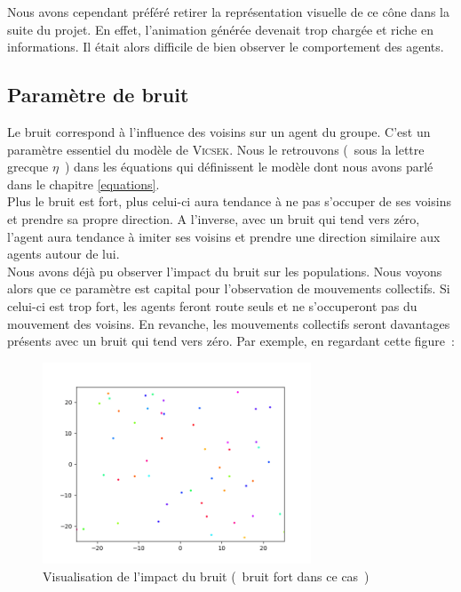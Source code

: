 \documentclass[french, a4paper, 12pt, openany]{report}
\begin{document}
	Nous avons cependant préféré retirer la représentation visuelle de ce cône dans la suite du projet. En effet, l'animation générée devenait trop chargée et riche en informations. Il était alors difficile de bien observer le comportement des agents.\\  
  
  \subsection{Paramètre de bruit}
    
   Le bruit correspond à l'influence des voisins sur un agent du groupe. C'est un paramètre essentiel du modèle de \textsc{Vicsek}. Nous le retrouvons (~sous la lettre grecque $\eta$~)  dans les équations qui définissent le modèle dont nous avons parlé dans le chapitre \ref{equations}.\\
   
   Plus le bruit est fort, plus celui-ci aura tendance à ne pas s'occuper de ses voisins et prendre sa propre direction. A l'inverse, avec un bruit qui tend vers zéro, l'agent aura tendance à imiter ses voisins et prendre une direction similaire aux agents autour de lui. \\
    
   Nous avons déjà pu observer l'impact du bruit sur les populations. Nous voyons alors que ce paramètre est capital pour l'observation de mouvements collectifs. Si celui-ci est trop fort, les agents feront route seuls et ne s'occuperont pas du mouvement des voisins. En revanche, les mouvements collectifs seront davantages présents avec un bruit qui tend vers zéro.
\newpage
Par exemple, en regardant cette figure~:


   \begin{figure}[!h]
		\centering
		\includegraphics[width=8cm]{images/image_10.png}
		\caption{Visualisation de l'impact du bruit (~bruit fort dans ce cas~)}
		\label{bruit}
	\end{figure}  
\end{document}
